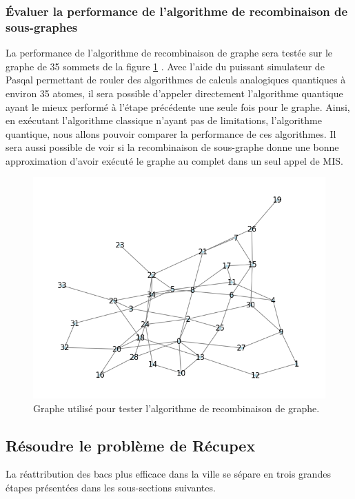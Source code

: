 \documentclass[11pt]{article}
\begin{document}
\subsubsection{Évaluer la performance de l'algorithme de recombinaison de sous-graphes}\label{indep}
La performance de l'algorithme de recombinaison de graphe sera testée sur le graphe de 35 sommets de la figure \ref{35atoms} . Avec l'aide du puissant simulateur de Pasqal permettant de rouler des algorithmes de calculs analogiques quantiques à environ 35 atomes, il sera possible d'appeler directement l'algorithme quantique ayant le mieux performé à l'étape précédente une seule fois pour le graphe. Ainsi, en exécutant l'algorithme classique n'ayant pas de limitations, l'algorithme quantique, nous allons pouvoir comparer la performance de ces algorithmes. Il sera aussi possible de voir si la recombinaison de sous-graphe donne une bonne approximation d'avoir exécuté le graphe au complet dans un seul appel de MIS.


\begin{figure}[H]
    \centering
    \includegraphics[width=0.49\linewidth]{images/35atomes.png}
    \caption{Graphe utilisé pour tester l'algorithme de recombinaison de graphe.}
    \label{35atoms}
\end{figure}

\subsection{Résoudre le problème de Récupex}
La réattribution des bacs plus efficace dans la ville se sépare en trois grandes étapes présentées dans les sous-sections suivantes.
\end{document}

